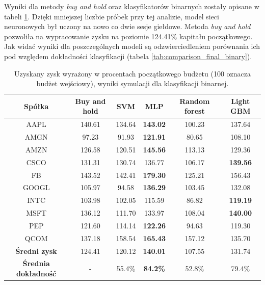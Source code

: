\documentclass[a4paper, twoside, 11pt, openright]{article}
\begin{document}
\bigskip

Wyniki dla metody \textit{buy and hold} oraz klasyfikatorów binarnych zostały opisane w tabeli \ref{tab:comparison_simulation_binary}. Dzięki mniejszej liczbie próbek przy tej analizie, model sieci neuronowych był uczony na nowo co dwie sesje giełdowe. Metoda \textit{buy and hold} pozwoliła na wypracowanie zysku na poziomie 124.41\% kapitału początkowego. Jak widać wyniki dla poszczególnych modeli są odzwierciedleniem porównania ich pod względem dokładności klasyfikacji (tabela \ref{tab:comparison_final_binary}). 

 \begin{table}[H]
    \centering
    \begin{tabular}{|c|c|c|c|c|c|}
    \hline
        \textbf{Spółka}  & \textbf{Buy and hold} & \textbf{SVM} &  \textbf{MLP}  &  \textbf{Random forest}  &  \textbf{Light GBM} \\ \hline
AAPL & 140.61 & 134.64  &  \textbf{143.02} & 100.23 & 137.64\\ \hline
AMGN & 97.23 &  91.93 & \textbf{121.91}  & 80.65 &  108.10 \\ \hline
AMZN & 126.58 &  120.51 & \textbf{145.56} & 113.13 & 129.36 \\ \hline
CSCO & 131.31 & 130.74  & 136.77  & 106.17 &  \textbf{139.56} \\ \hline
FB   & 143.52 & 142.41  & \textbf{179.30} & 125.21 & 156.43 \\ \hline
GOOGL & 105.97 &  94.58 &  \textbf{136.29} & 103.45 & 132.08 \\ \hline
INTC & 103.98 & 102.05  & 115.59  & 86.82 & \textbf{119.19} \\ \hline
MSFT &  136.12 & 111.70  &  133.97  & 108.04 & \textbf{140.00} \\ \hline
PEP  & 121.60 &  114.14 &  \textbf{122.26} & 94.63 & 119.30 \\ \hline
QCOM & 137.18 &  158.54 &  \textbf{165.43} & 157.12 & 135.70  \\ \hline \hline
\textbf{Średni zysk} & 124.41 & 120.12 & \textbf{140.01} &  107.55 & 131.74 \\  \hline 
\textbf{Średnia dokładność} &  - & 55.4\% & \textbf{84.2\%} &  52.8\% & 79.4\% \\  \hline   
    \end{tabular}
    \caption{Uzyskany zysk wyrażony w procentach początkowego budżetu (100 oznacza budżet wejściowy), wyniki symulacji dla klasyfikacji binarnej.}
    \label{tab:comparison_simulation_binary}
\end{table}   
\end{document}
